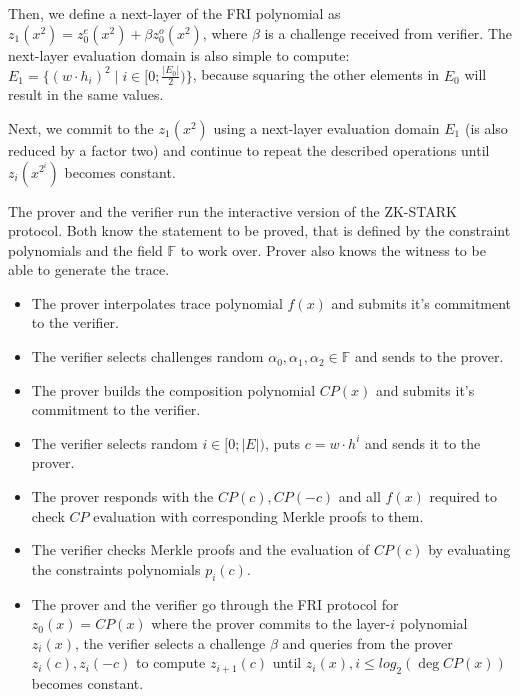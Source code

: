 \documentclass[../lecture-notes.tex]{subfiles}
\begin{document}
Then, we define a next-layer of the FRI polynomial as $z_1(x^2) = z_0^e(x^2) + \beta z_0^o(x^2)$, where $\beta$ is a challenge received from verifier. The next-layer evaluation domain is also simple to compute: $E_1 = \{(w\cdot h_i)^2 \;|\; i \in [0;\frac{|E_0|}{2})\}$, because squaring the other elements in $E_0$ will result in the same values.

Next, we commit to the $z_1(x^2)$ using a next-layer evaluation domain $E_1$ (is also reduced by a factor two) and continue to repeat the described operations until $z_i(x^{2^i})$ becomes constant.

\begin{tcolorbox}[title=Interactive ZK-STARK protocol,
    colback=blue!5!white,
    colframe=blue!75!black,
    colbacktitle=blue!25!white,
    coltitle=blue!20!black,
    fonttitle=\bfseries,
    boxrule=1.25pt,
    subtitle style={boxrule=0pt,
    colback=blue!20!white,
    colupper=blue!75!gray} ]
    \small

    The prover and the verifier run the interactive version of the ZK-STARK protocol. Both know the statement to be proved, that is defined by the constraint polynomials and the field $\mathbb{F}$ to work over. Prover also knows the witness to be able to generate the trace.

    \begin{itemize}[label=]
        \item The prover interpolates trace polynomial $f(x)$ and submits it's commitment to the verifier.
        \item The verifier selects challenges random $\alpha_0, \alpha_1, \alpha_2 \in \mathbb{F}$ and sends to the prover.
        \item The prover builds the composition polynomial $CP(x)$ and submits it's commitment to the verifier.
    \end{itemize}

    \begin{itemize}[label=]
        \item The verifier selects random $i \in [0; |E|)$, puts $c = w\cdot h^i$ and sends it to the prover.
        \item The prover responds with the $CP(c), CP(-c)$ and all $f(x)$ required to check $CP$ evaluation with corresponding Merkle proofs to them.
        \item The verifier checks Merkle proofs and the evaluation of $CP(c)$ by evaluating the constraints polynomials $p_i(c)$.
        \item The prover and the verifier go through the FRI protocol for $z_0(x) = CP(x)$ where the prover commits to the layer-$i$ polynomial $z_i(x)$, the verifier selects a challenge $\beta$ and queries from the prover $z_i(c), z_i(-c)$ to compute $z_{i+1}(c)$ until $z_i(x), i \leq log_2(\deg CP(x))$ becomes constant.
    \end{itemize}
    
\end{tcolorbox}
\end{document}
